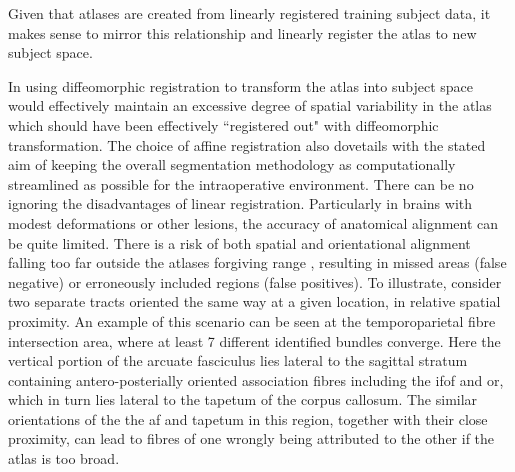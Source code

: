 Given that atlases are created from linearly registered training subject data, it makes sense to mirror this relationship and linearly register the atlas to new subject space.

In using diffeomorphic registration to transform the atlas into subject space would effectively maintain an excessive degree of spatial variability in the atlas which should have been effectively ``registered out" with diffeomorphic transformation.
The choice of affine registration also dovetails with the stated aim of keeping the overall segmentation methodology as computationally streamlined as possible for the intraoperative environment.
There can be no ignoring the disadvantages of linear registration.
Particularly in brains with modest deformations or other lesions, the accuracy of anatomical alignment can be quite limited.
There is a risk of both spatial and orientational alignment falling too far outside the atlases forgiving range , resulting in missed areas (false negative) or erroneously included regions (false positives).
To illustrate, consider two separate tracts oriented the same way at a given location, in relative spatial proximity.
An example of this scenario can be seen at the temporoparietal fibre intersection area, where at least 7 different  identified bundles converge.
Here the vertical portion of the arcuate fasciculus lies lateral to the sagittal stratum containing antero-posterially oriented association fibres including the \gls{ifof} and \gls{or}, which in turn lies lateral to the tapetum of the corpus callosum.
The similar orientations of the the \gls{af} and tapetum in this region, together with their close proximity, can lead to fibres of one wrongly being attributed to the other if the atlas is too broad.

